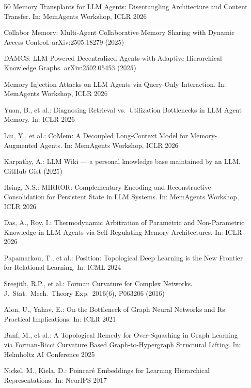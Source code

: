 \documentclass[hf]{ceurart}
\begin{document}
\begin{thebibliography}{50}
Memory Transplants for LLM Agents: Disentangling Architecture and
Content Transfer. In: MemAgents Workshop, ICLR 2026

Collabor Memory: Multi-Agent Collaborative Memory Sharing with
Dynamic Access Control. arXiv:2505.18279 (2025)

DAMCS: LLM-Powered Decentralized Agents with Adaptive Hierarchical
Knowledge Graphs. arXiv:2502.05453 (2025)

Memory Injection Attacks on LLM Agents via Query-Only Interaction.
In: MemAgents Workshop, ICLR 2026

Yuan, B., et al.: Diagnosing Retrieval vs.\ Utilization Bottlenecks
in LLM Agent Memory. In: ICLR 2026

Liu, Y., et al.: CoMem: A Decoupled Long-Context Model for
Memory-Augmented Agents. In: MemAgents Workshop, ICLR 2026

Karpathy, A.: LLM Wiki --- a personal knowledge base maintained by
an LLM. GitHub Gist (2025)

Hsing, N.S.: MIRROR: Complementary Encoding and Reconstructive
Consolidation for Persistent State in LLM Systems. In: MemAgents
Workshop, ICLR 2026

Das, A., Roy, I.: Thermodynamic Arbitration of Parametric and
Non-Parametric Knowledge in LLM Agents via Self-Regulating Memory
Architectures. In: ICLR 2026

Papamarkou, T., et al.: Position: Topological Deep Learning is the
New Frontier for Relational Learning. In: ICML 2024

Sreejith, R.P., et al.: Forman Curvature for Complex Networks.
J.\ Stat.\ Mech.\ Theory Exp.\ 2016(6), P063206 (2016)

Alon, U., Yahav, E.: On the Bottleneck of Graph Neural Networks and
Its Practical Implications. In: ICLR 2021

Banf, M., et al.: A Topological Remedy for Over-Squashing in Graph
Learning via Forman-Ricci Curvature Based Graph-to-Hypergraph
Structural Lifting. In: Helmholtz AI Conference 2025

Nickel, M., Kiela, D.: Poincar\'{e} Embeddings for Learning
Hierarchical Representations. In: NeurIPS 2017


\end{thebibliography}
\end{document}
